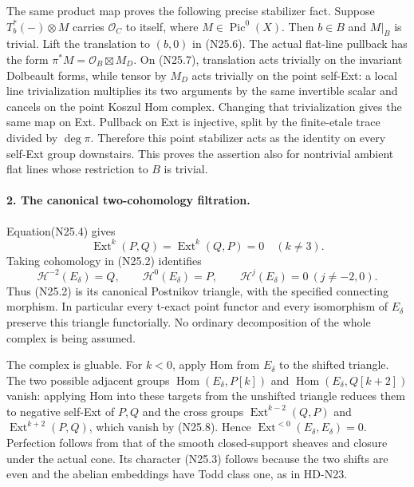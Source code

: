 The same product map proves the following precise stabilizer
fact. Suppose $T_b^*(-)\otimes M$ carries $\mathcal O_C$ to
itself, where $M\in\operatorname{Pic}^0(X)$. Then $b\in B$
and $M|_B$ is trivial. Lift the translation to $(b,0)$ in
(N25.6). The actual flat-line pullback has the form
$\pi^*M=\mathcal O_B\boxtimes M_D$. On (N25.7), translation
acts trivially on the invariant Dolbeault forms, while tensor
by $M_D$ acts trivially on the point self-Ext: a local line
trivialization multiplies its two arguments by the same
invertible scalar and cancels on the point Koszul Hom complex.
Changing that trivialization gives the same map on Ext.
Pullback on Ext is injective, split by the finite-etale trace
divided by $\deg\pi$. Therefore this point stabilizer acts
as the identity on every self-Ext group downstairs.
This proves the assertion also for nontrivial ambient flat
lines whose restriction to $B$ is trivial.

\paragraph{2. The canonical two-cohomology filtration.}
Equation(N25.4) gives
\[
             \operatorname{Ext}^k(P,Q)=
             \operatorname{Ext}^k(Q,P)=0\quad(k\ne3).
                                                               \tag{N25.8}
\]
Taking cohomology in (N25.2) identifies
\[
          \mathcal H^{-2}(E_\delta)=Q,\qquad
          \mathcal H^0(E_\delta)=P,
          \qquad\mathcal H^j(E_\delta)=0\ (j\ne-2,0).
                                                               \tag{N25.9}
\]
Thus (N25.2) is its canonical Postnikov triangle, with the
specified connecting morphism. In particular every t-exact
point functor and every isomorphism of $E_\delta$ preserve
this triangle functorially. No ordinary decomposition of the
whole complex is being assumed.

The complex is gluable. For $k<0$, apply Hom from $E_\delta$
to the shifted triangle. The two possible adjacent groups
$\operatorname{Hom}(E_\delta,P[k])$ and
$\operatorname{Hom}(E_\delta,Q[k+2])$ vanish: applying Hom
into these targets from the unshifted triangle reduces them
to negative self-Ext of $P,Q$ and the cross groups
$\operatorname{Ext}^{k-2}(Q,P)$ and
$\operatorname{Ext}^{k+2}(P,Q)$, which vanish by (N25.8).
Hence $\operatorname{Ext}^{<0}(E_\delta,E_\delta)=0$.
Perfection follows from that of the smooth closed-support
sheaves and closure under the actual cone. Its character
(N25.3) follows because the two shifts are even and the
abelian embeddings have Todd class one, as in HD-N23.

